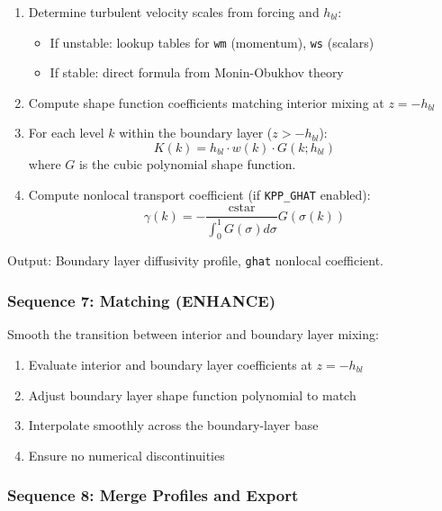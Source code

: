 \documentclass[11pt, a4paper]{article}
\begin{document}
\begin{enumerate}
    \item Determine turbulent velocity scales from forcing and $h_{bl}$:
    \begin{itemize}
        \item If unstable: lookup tables for \texttt{wm} (momentum), \texttt{ws} (scalars)
        \item If stable: direct formula from Monin-Obukhov theory
    \end{itemize}
    
    \item Compute shape function coefficients matching interior mixing at $z = -h_{bl}$
    
    \item For each level $k$ within the boundary layer ($z > -h_{bl}$):
    \begin{equation}
    K(k) = h_{bl} \cdot w(k) \cdot G(k; h_{bl})
    \end{equation}
    where $G$ is the cubic polynomial shape function.
    
    \item Compute nonlocal transport coefficient (if \texttt{KPP\_GHAT} enabled):
    \begin{equation}
    \gamma(k) = -\frac{\text{cstar}}{\int_0^1 G(\sigma)d\sigma} G(\sigma(k))
    \end{equation}
\end{enumerate}

Output: Boundary layer diffusivity profile, \texttt{ghat} nonlocal coefficient.

\subsubsection{Sequence 7: Matching (ENHANCE)}

Smooth the transition between interior and boundary layer mixing:

\begin{enumerate}
    \item Evaluate interior and boundary layer coefficients at $z = -h_{bl}$
    \item Adjust boundary layer shape function polynomial to match
    \item Interpolate smoothly across the boundary-layer base
    \item Ensure no numerical discontinuities
\end{enumerate}

\subsubsection{Sequence 8: Merge Profiles and Export}
\end{document}

